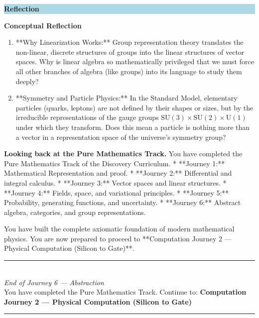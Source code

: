 \documentclass[12pt, a4paper]{article}
\newenvironment{reflectionbox}
  {\par\medskip\fillcolorbox{LightBlue}{ReflectColor}{Reflection}}
  {\par\medskip}
\newcommand{\fillcolorbox}[3]{%
  \noindent
  \filldrawbox{#1}{#2}{\textbf{\sffamily\color{white}#3}}\par\nobreak\vspace{4pt}
}
\newcommand{\filldrawbox}[3]{%
  \colorbox{#1}{\parbox{\dimexpr\linewidth-2\fboxsep\relax}{%
    \vspace{4pt}\noindent\hspace{4pt}#3\vspace{4pt}%
  }}%
}
\begin{document}
\begin{reflectionbox}
\textbf{Conceptual Reflection}

\begin{enumerate}
  \item **Why Linearization Works:** Group representation theory translates the non-linear, discrete structures of groups into the linear structures of vector spaces. Why is linear algebra so mathematically privileged that we must force all other branches of algebra (like groups) into its language to study them deeply?
  \item **Symmetry and Particle Physics:** In the Standard Model, elementary particles (quarks, leptons) are not defined by their shapes or sizes, but by the irreducible representations of the gauge groups $\text{SU}(3) \times \text{SU}(2) \times \text{U}(1)$ under which they transform. Does this mean a particle is nothing more than a vector in a representation space of the universe's symmetry group?
\end{enumerate}
\end{reflectionbox}

\medskip
\noindent\textbf{Looking back at the Pure Mathematics Track.}
You have completed the Pure Mathematics Track of the Discovery Curriculum.
* **Journey 1:** Mathematical Representation and proof.
* **Journey 2:** Differential and integral calculus.
* **Journey 3:** Vector spaces and linear structures.
* **Journey 4:** Fields, space, and variational principles.
* **Journey 5:** Probability, generating functions, and uncertainty.
* **Journey 6:** Abstract algebra, categories, and group representations.

You have built the complete axiomatic foundation of modern mathematical physics. You are now prepared to proceed to **Computation Journey 2 --- Physical Computation (Silicon to Gate)**.

\vspace{1.4cm}
\begin{center}
{\color{NavyBlue}\rule{0.5\linewidth}{0.8pt}}\\[6pt]
{\small\color{NavyBlue}\textit{End of Journey 6 --- Abstraction}}\\[4pt]
{\small\color{NavyBlue}You have completed the Pure Mathematics Track. Continue to: \textbf{Computation Journey 2 --- Physical Computation (Silicon to Gate)}}\\[6pt]
{\color{NavyBlue}\rule{0.5\linewidth}{0.8pt}}
\end{center}
\end{document}
